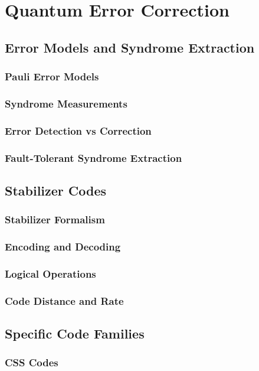 \documentclass[12pt,a4paper]{book}
\begin{document}
\chapter{Quantum Error Correction}

\section{Error Models and Syndrome Extraction}
\subsection{Pauli Error Models}
\subsection{Syndrome Measurements}
\subsection{Error Detection vs Correction}
\subsection{Fault-Tolerant Syndrome Extraction}

\section{Stabilizer Codes}
\subsection{Stabilizer Formalism}
\subsection{Encoding and Decoding}
\subsection{Logical Operations}
\subsection{Code Distance and Rate}

\section{Specific Code Families}
\subsection{CSS Codes}
\end{document}
